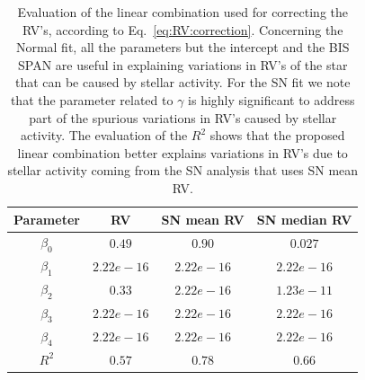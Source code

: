 \documentclass{aa}
\begin{document}
\begin{table}
\centering
\begin{tabular}{|c|c|c|c|}
\hline
Parameter          & RV         &   SN mean RV &   SN median RV \\
\hline
$\beta_{0}$            &    $0.49$    & $0.90 $  & $0.027$ \\
\hline
$\beta_{1}$            &    $2.22e-16$    & $2.22e-16 $  & $2.22e-16$ \\
\hline
$\beta_{2}$            &     $0.33$   & $2.22e-16 $ & $1.23e-11$\\
\hline
$\beta_{3}$            &     $ 2.22e-16$   &  $2.22e-16 $  & $ 2.22e-16$\\
\hline
$\beta_{4}$            &     $2.22e-16$   &  $2.22e-16 $ & $ 2.22e-16 $\\
\hline
$R^{2}$      &     $0.57$    &  $0.78$ & $0.66$  \\
\hline
\end{tabular}
\caption{Evaluation of the linear combination used for correcting the RV's, according to Eq.~\ref{eq:RV:correction}. Concerning the Normal fit, all the parameters but the intercept and the BIS SPAN are useful in explaining variations in RV's of the star that can be caused by stellar activity. For the SN fit we note that the parameter related to $\gamma$ is highly significant to address part of the spurious variations in RV's caused by stellar activity. The evaluation of the $R^2$ shows that the proposed linear combination better explains variations in RV's due to stellar activity coming from the SN analysis that uses SN mean RV.}
\label{table:alphacent.test}
\end{table}

\end{document}
